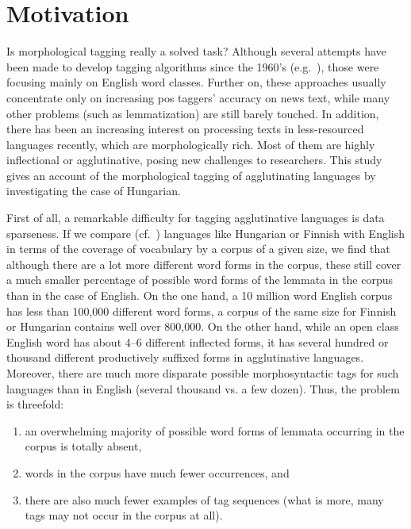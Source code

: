 \section{Motivation}

Is morphological tagging really a solved task? 
Although several attempts have been made to develop tagging algorithms since the 1960’s (e.g.~\cite{Stolz1965,Klein1963}), those were focusing mainly on English word classes. 
Further on, these approaches usually concentrate only on increasing \gls{pos} taggers’ accuracy on news text, while many other problems (such as lemmatization) are still barely touched. 
In addition, there has been an increasing interest on processing texts in less-resourced languages recently, which are morphologically rich. 
Most of them are highly inflectional or agglutinative, posing new challenges to researchers. This study gives an account of the morphological tagging of agglutinating languages by investigating the case of Hungarian. 

First of all, a remarkable difficulty for tagging agglutinative languages is data sparseness. If we compare (cf.~\cite{Oravecz2002a}) languages like Hungarian or Finnish with English in terms of the coverage of vocabulary by a corpus of a given size, we find that although there are a lot more different word forms in the corpus, these still cover a much smaller percentage of possible word forms of the lemmata in the corpus than in the case of English. 
On the one hand, a 10 million word English corpus has less than 100,000 different word forms, a corpus of the same size for Finnish or Hungarian contains well over 800,000. On the other hand, while an open class English word has about 4--6 different inflected forms, it has several hundred or thousand different productively suffixed forms in agglutinative languages. Moreover, there are much more disparate possible morphosyntactic tags for such languages than in English (several thousand vs. a few dozen). 
Thus, the problem is threefold:
\begin{enumerate}
  \item an overwhelming majority of possible word forms of lemmata occurring in the corpus is totally absent,
  \item words in the corpus have much fewer occurrences, and
  \item there are also much fewer examples of tag sequences (what is more, many tags may not occur in the corpus at all).
\end{enumerate}

